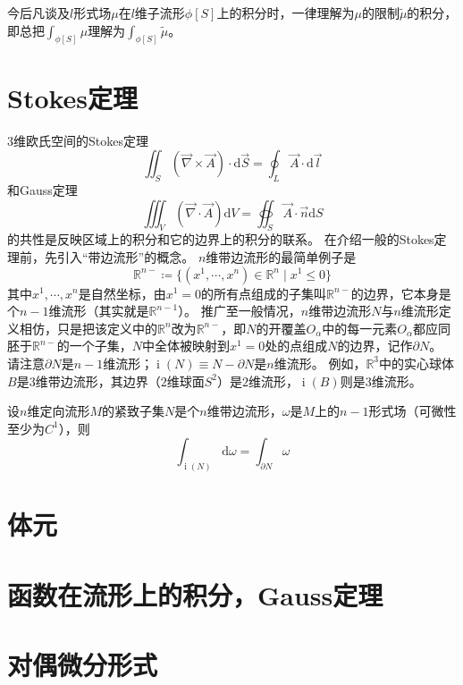 今后凡谈及$l$形式场$\mu$在$l$维子流形$\phi[S]$上的积分时，一律理解为$\mu$的限制$\tilde\mu$的积分，即总把$\displaystyle\int_{\phi[S]}\mu$理解为$\displaystyle\int_{\phi[S]}\tilde\mu$。

\section{Stokes定理}

$3$维欧氏空间的Stokes定理
$$\iint_S(\vec\nabla \times \vec{A})\cdot\mathrm{d}\vec{S} = \oint_L\vec{A}\cdot\mathrm{d}\vec{l}$$
和Gauss定理
$$\iiint_V(\vec\nabla\cdot\vec{A})\mathrm{d}V = \oiint_S\vec{A}\cdot\vec{n}\mathrm{d}S$$
的共性是反映区域上的积分和它的边界上的积分的联系。
在介绍一般的Stokes定理前，先引入``带边流形''的概念。
$n$维带边流形的最简单例子是
$$\mathbb{R}^{n-} \coloneq \{(x^1, \cdots, x^n) \in \mathbb{R}^n \mid x^1 \leq 0\}$$
其中$x^1, \cdots, x^n$是自然坐标，由$x^1 = 0$的所有点组成的子集叫$\mathbb{R}^{n-}$的边界，它本身是个$n - 1$维流形（其实就是$\mathbb{R}^{n - 1}$）。
推广至一般情况，$n$维带边流形$N$与$n$维流形定义相仿，只是把该定义中的$\mathbb{R}^n$改为$\mathbb{R}^{n-}$，即$N$的开覆盖${O_\alpha}$中的每一元素$O_\alpha$都应同胚于$\mathbb{R}^{n-}$的一个子集，$N$中全体被映射到$x^1 = 0$处的点组成$N$的边界，记作$\partial N$。
请注意$\partial N$是$n - 1$维流形；$\operatorname{i}(N) \equiv N - \partial N$是$n$维流形。
例如，$\mathbb{R}^3$中的实心球体$B$是$3$维带边流形，其边界（$2$维球面$S^2$）是$2$维流形，$\operatorname{i}(B)$则是$3$维流形。

\begin{theorem}
    设$n$维定向流形$M$的紧致子集$N$是个$n$维带边流形，$\omega$是$M$上的$n - 1$形式场（可微性至少为$C^1$），则
    $$\int_{\operatorname{i}(N)}\mathrm{d}\omega = \int_{\partial N}\omega$$
\end{theorem}

\section{体元}

\section{函数在流形上的积分，Gauss定理}

\section{对偶微分形式}

